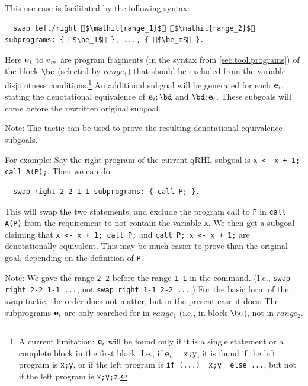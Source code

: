 \documentclass{article}
\begin{document}
This use case is facilitated by the following syntax:
\begin{lstlisting}
  swap left/right $\mathit{range_1}$ $\mathit{range_2}$ subprograms: { $\be_1$ }, ..., { $\be_m$ }.
\end{lstlisting}
Here $\mathbf e_1$ to $\mathbf e_m$ are program fragments (in the syntax from \autoref{sec:tool.programs}) of the block $\bc$ (selected by $\mathit{range_1}$) that should be excluded from the variable disjointness conditions.\footnote{%
  A current limitation: $\mathbf e_i$ will be found only if it is a single statement or a complete block in the first block.
  I.e., if $\be_i=\texttt{x;y}$, it is found if the left program is \texttt{x;y}, or if the left program is \texttt{if (...) { x;y } else ...}, but not if the left program is \texttt{x;y;z}.}
An additional subgoal will be generated for each $\mathbf e_i$, stating the denotational equivalence of $\be_i;\bd$ and $\bd;\be_i$.
These subgoals will come before the rewritten original subgoal.

Note: The  tactic can be used to prove the resulting denotational-equivalence subgoals.

\medskip

For example: Say the right program of the current qRHL subgoal is \texttt{x <- x + 1; call A(P);}. Then we can do:
\begin{lstlisting}
  swap right 2-2 1-1 subprograms: { call P; }.
\end{lstlisting}
This will swap the two statements, and exclude the program call to \texttt{P} in \texttt{call A(P)} from the requirement to not contain the variable \texttt{x}.
We then get a subgoal claiming that \texttt{x <- x + 1; call P;} and \texttt{call P; x <- x + 1;} are denotationally equivalent.
This may be much easier to prove than the original goal, depending on the definition of \texttt{P}.

Note: We gave the range \texttt{2-2} before the range \texttt{1-1} in the command.
(I.e., \texttt{swap right 2-2 1-1 ...}, not \texttt{swap right 1-1 2-2 ...}.)
For the basic form of the swap tactic, the order does not matter, but in the present case it does:
The subprograms $\mathbf e_i$ are only searched for in $\mathit{range_1}$ (i.e., in block $\bc$), not in $\mathit{range_2}$.

\medskip
\end{document}
